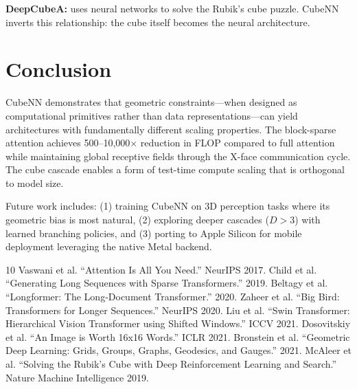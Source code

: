 \documentclass{article}
\begin{document}
\textbf{DeepCubeA:} \cite{mcAleer2019deepcube} uses neural networks to solve the Rubik's cube puzzle. CubeNN inverts this relationship: the cube itself becomes the neural architecture.

\section{Conclusion}

CubeNN demonstrates that geometric constraints—when designed as computational primitives rather than data representations—can yield architectures with fundamentally different scaling properties. The block-sparse attention achieves 500--10,000$\times$ reduction in FLOP compared to full attention while maintaining global receptive fields through the X-face communication cycle. The cube cascade enables a form of test-time compute scaling that is orthogonal to model size.

Future work includes: (1) training CubeNN on 3D perception tasks where its geometric bias is most natural, (2) exploring deeper cascades ($D {>} 3$) with learned branching policies, and (3) porting to Apple Silicon for mobile deployment leveraging the native Metal backend.


\begin{thebibliography}{10}
 Vaswani et al. ``Attention Is All You Need.'' NeurIPS 2017.
 Child et al. ``Generating Long Sequences with Sparse Transformers.'' 2019.
 Beltagy et al. ``Longformer: The Long-Document Transformer.'' 2020.
 Zaheer et al. ``Big Bird: Transformers for Longer Sequences.'' NeurIPS 2020.
 Liu et al. ``Swin Transformer: Hierarchical Vision Transformer using Shifted Windows.'' ICCV 2021.
 Dosovitskiy et al. ``An Image is Worth 16x16 Words.'' ICLR 2021.
 Bronstein et al. ``Geometric Deep Learning: Grids, Groups, Graphs, Geodesics, and Gauges.'' 2021.
 McAleer et al. ``Solving the Rubik's Cube with Deep Reinforcement Learning and Search.'' Nature Machine Intelligence 2019.
\end{thebibliography}
\end{document}
